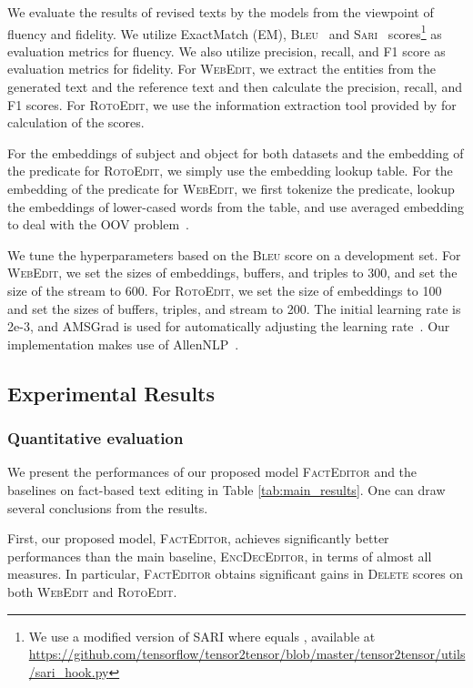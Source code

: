 \documentclass[11pt,a4paper]{article}
\begin{document}
We evaluate the results of revised texts by the models from the viewpoint of fluency and fidelity. We utilize ExactMatch (EM), \textsc{Bleu}~\cite{papineni-etal-2002-bleu} and \textsc{Sari}~\cite{xu2016optimizing} scores\footnote{We use a modified version of \textsc{SARI} where  equals , available at \url{https://github.com/tensorflow/tensor2tensor/blob/master/tensor2tensor/utils/sari_hook.py}} as evaluation metrics for fluency. We also utilize precision, recall, and F1 score as evaluation metrics for fidelity. For \textsc{WebEdit}, we extract the entities from the generated text and the reference text and then calculate the precision, recall, and F1 scores. For \textsc{RotoEdit}, we use the information extraction tool provided by \citet{wiseman2017challenges} for calculation of the scores.

For the embeddings of subject and object for both datasets and the embedding of the predicate for \textsc{RotoEdit}, we simply use the embedding lookup table. For the embedding of the predicate for \textsc{WebEdit}, we first tokenize the predicate, lookup the embeddings of lower-cased words from the table, and use averaged embedding to deal with the OOV problem~\cite{moryossef2019step}.

We tune the hyperparameters based on the \textsc{Bleu} score on a development set. For \textsc{WebEdit}, we set the sizes of embeddings, buffers, and triples to 300, and set the size of the stream to 600. For \textsc{RotoEdit}, we set the size of embeddings to 100 and set the sizes of buffers, triples, and stream to 200. The initial learning rate is 2e-3, and AMSGrad is used for automatically adjusting the learning rate~\cite{reddi2018convergence}. Our implementation makes use of AllenNLP~\cite{gardner2018allennlp}.

\subsection{Experimental Results}
\label{sec:results}

\subsubsection*{Quantitative evaluation}
We present the performances of our proposed model \textsc{FactEditor} and the baselines on fact-based text editing in Table \ref{tab:main_results}. One can draw several conclusions from the results.

First, our proposed model, \textsc{FactEditor}, achieves significantly better performances than the main baseline, \textsc{EncDecEditor}, in terms of almost all measures. In particular, \textsc{FactEditor} obtains significant gains in \textsc{Delete} scores on both \textsc{WebEdit} and \textsc{RotoEdit}.
\end{document}
